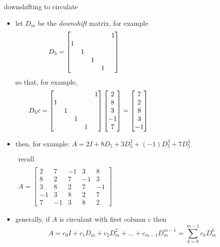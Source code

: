 \documentclass[10pt,
               svgnames,
               hyperref={colorlinks,citecolor=DeepPink4,linkcolor=FireBrick,urlcolor=Maroon},
               usepdftitle=false]{beamer}
\begin{document}
\begin{frame}{downshifting to circulate}

\begin{itemize}
\item let $D_m$ be the \emph{downshift} matrix, for example
{\small
	$$D_5 = \begin{bmatrix} & & & & 1 \\ 1 & & & & \\ & 1 & & & \\ & & 1 & & \\ & & & 1 & \end{bmatrix} \hspace{50mm}$$
}
so that, for example,
{\small
	$$D_5 c = \begin{bmatrix} & & & & 1 \\ 1 & & & & \\ & 1 & & & \\ & & 1 & & \\ & & & 1 & \end{bmatrix} \begin{bmatrix} 2 \\ 8 \\ 3 \\ -1 \\ 7 \end{bmatrix} = \begin{bmatrix} 7 \\ 2 \\ 8 \\ 3 \\ -1 \end{bmatrix} \hspace{45mm}$$
}
\item then, for example: \qquad $\displaystyle A = 2 I + 8 D_5 + 3 D_5^2 + (-1) D_5^3 + 7 D_5^4$

\vspace{-50mm}
{\scriptsize
\hfill $\displaystyle \boxed{\begin{matrix} \text{recall} \\ \\ A = \begin{bmatrix} 2 & 7 & -1 & 3 & 8 \\ 8 & 2 & 7 & -1 & 3 \\ 3 & 8 & 2 & 7 & -1 \\ -1 & 3 & 8 & 2 & 7 \\ 7 & -1 & 3 & 8 & 2 \end{bmatrix} \end{matrix}}$
}

\vspace{30mm}
\item generally, if $A$ is circulant with first column $c$ then
	$$A = c_0 I + c_1 D_m + c_2 D_m^2 + \dots + c_{m-1} D_m^{m-1} = \sum_{k=0}^{m-1} c_k D_m^k$$
\end{itemize}
\end{frame}
\end{document}

